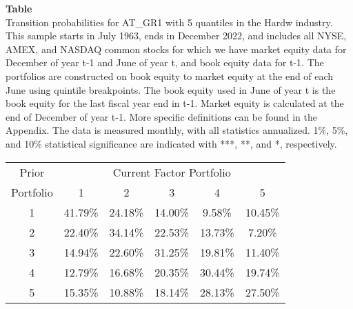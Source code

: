 \begin{table*}[ht!]
\raggedright
{}
\label{tab: transition_probs_AT_GR1_Hardw_with_5_quantiles}
\textbf{Table \thetable} \\
Transition probabilities for AT_GR1 with 5 quantiles in the Hardw industry. \\
\hspace*{1em}This sample starts in July 1963, ends in December 2022, and includes all NYSE, AMEX, and NASDAQ common stocks for which we have market equity data for December of year t-1 and June of year t, and book equity data for t-1. The portfolios are constructed on book equity to market equity at the end of each June using quintile breakpoints.  The book equity used in June of year t is the book equity for the last fiscal year end in t-1.  Market equity is calculated at the end of December of year t-1.  More specific definitions can be found in the Appendix.  The data is measured monthly, with all statistics annualized.  1\%, 5\%, and 10\% statistical significance are indicated with ***, **, and *, respectively. \\
\vspace{0.5em}
\centering
\begin{adjustbox}{max width=\textwidth}
\begin{tabular}{@{}cccccc@{}}
\toprule
Prior & \multicolumn{5}{c}{Current Factor Portfolio} \\
Portfolio & 1 & 2 & 3 & 4 & 5 \\
\midrule
1 & 41.79\% & 24.18\% & 14.00\% & 9.58\% & 10.45\% \\
2 & 22.40\% & 34.14\% & 22.53\% & 13.73\% & 7.20\% \\
3 & 14.94\% & 22.60\% & 31.25\% & 19.81\% & 11.40\% \\
4 & 12.79\% & 16.68\% & 20.35\% & 30.44\% & 19.74\% \\
5 & 15.35\% & 10.88\% & 18.14\% & 28.13\% & 27.50\% \\
\bottomrule
\end{tabular}
\end{adjustbox}
\end{table*}